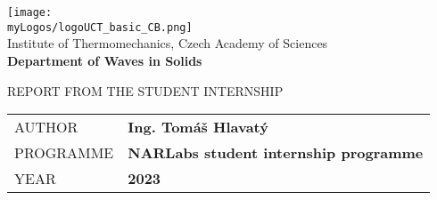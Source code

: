 \thispagestyle{empty}




\begin{titlepage}

\hspace{5.5cm}

\texttt{[image: \\myLogos/logoUCT\_basic\_CB.png]} \\[0.3cm]

\color{black!60}\Large\textsf{Institute of Thermomechanics, Czech Academy of Sciences}\\[0.4cm]
\color{black}
{\fontsize{16}{60}\selectfont \textbf{{\textsf{Department of Waves in Solids}}}\\[0.6cm]}


{\fontsize{35}{60}}

{{\Large \textsf{REPORT FROM THE STUDENT INTERNSHIP}}\\[0.4cm]}

\vfill

\begin{tabular}{p{}|p{}}
\textsf{\small\color{chaptergrey}AUTHOR}         &   \textbf{\Large\textsf{Ing. Tomáš Hlavatý}}\\[0.1cm]
\textsf{\small\color{chaptergrey}PROGRAMME}    &   \textbf{\Large\textsf{NARLabs student internship programme}}\\[0.1cm]
\textsf{\small\color{chaptergrey}YEAR}           &   \textbf{\Large\textsf{2023}}
\end{tabular}

\end{titlepage}

